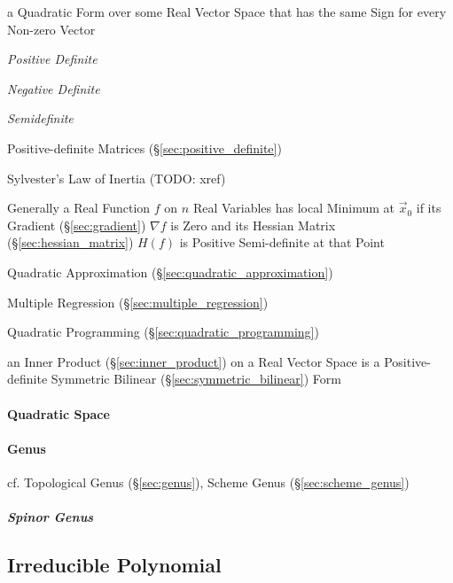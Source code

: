 a Quadratic Form over some Real Vector Space that has the same Sign
for every Non-zero Vector

\emph{Positive Definite}

\emph{Negative Definite}

\emph{Semidefinite}

\fist Positive-definite Matrices (\S\ref{sec:positive_definite})

\fist Sylvester's Law of Inertia (TODO: xref)

Generally a Real Function $f$ on $n$ Real Variables has local Minimum at
$\vec{x}_0$ if its Gradient (\S\ref{sec:gradient}) $\nabla f$ is Zero and its
Hessian Matrix (\S\ref{sec:hessian_matrix}) $H(f)$ is Positive Semi-definite at
that Point

\fist Quadratic Approximation (\S\ref{sec:quadratic_approximation})

\fist Multiple Regression (\S\ref{sec:multiple_regression})

\fist Quadratic Programming (\S\ref{sec:quadratic_programming})

an Inner Product (\S\ref{sec:inner_product}) on a Real Vector Space is
a Positive-definite Symmetric Bilinear
(\S\ref{sec:symmetric_bilinear}) Form



\paragraph{Quadratic Space}\label{sec:quadratic_space}\hfill

\paragraph{Genus}\label{sec:quadratic_genus}\hfill

\fist cf. Topological Genus (\S\ref{sec:genus}), Scheme Genus
(\S\ref{sec:scheme_genus})



\subparagraph{Spinor Genus}\label{sec:spinor_genus}\hfill



\subsection{Irreducible Polynomial}\label{sec:irreducible_polynomial}

